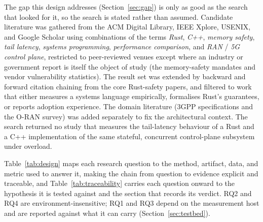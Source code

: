 \documentclass[english,twoside,openright,a4paper,censored,csm,software-track-2020]{HYthesisML}
\begin{document}
The gap this design addresses (Section~\ref{sec:gap}) is only as good as the search that looked
for it, so the search is stated rather than assumed. Candidate literature was gathered from the
ACM Digital Library, IEEE Xplore, USENIX, and Google Scholar using combinations of the terms
\emph{Rust}, \emph{C++}, \emph{memory safety}, \emph{tail latency}, \emph{systems programming},
\emph{performance comparison}, and \emph{RAN} / \emph{5G control plane}, restricted to
peer-reviewed venues except where an industry or government report is itself the object of study
(the memory-safety mandates and vendor vulnerability statistics). The result set was extended by
backward and forward citation chaining from the core Rust-safety papers, and filtered to work
that either measures a systems language empirically, formalises Rust's guarantees, or reports
adoption experience. The domain literature (3GPP specifications and the O-RAN survey) was added
separately to fix the architectural context. The search returned no study that measures the
tail-latency behaviour of a Rust and a C++ implementation of the same stateful, concurrent
control-plane subsystem under overload.

Table~\ref{tab:design} maps each research question to the method, artifact, data, and metric
used to answer it, making the chain from question to evidence explicit and traceable, and
Table~\ref{tab:traceability} carries each question onward to the hypothesis it is tested
against and the section that records its verdict. RQ2 and RQ4 are environment-insensitive;
RQ1 and RQ3 depend on the measurement host and are reported against what it can carry
(Section~\ref{sec:testbed}).
\end{document}
